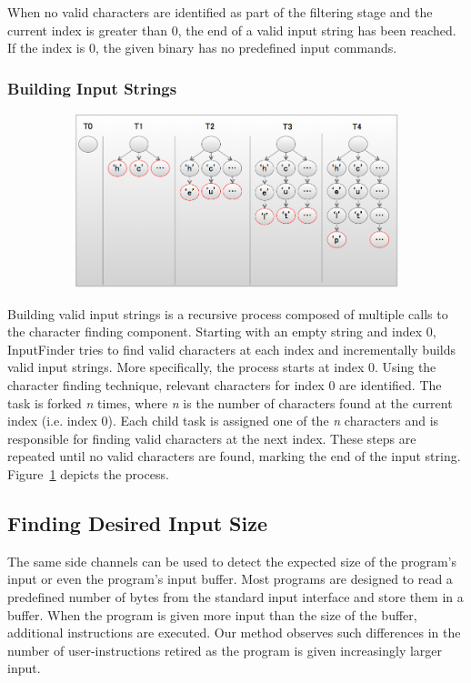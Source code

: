 \documentclass[10pt,twocolumn]{article}
\def \tool {InputFinder}
\begin{document}
When no valid characters are identified as part of the filtering stage and the current index is greater than 0, the end of a valid input string has been reached. If the index is 0, the given binary has no predefined input commands.

\subsubsection{Building Input Strings}

\begin{figure}[t]
\centering
\includegraphics[height=2in,width=6.5in]{string_builder.png}
\label{fig:string_builder}
\caption{}
\end{figure}


Building valid input strings is a recursive process composed of multiple calls to the character finding component.
Starting with an empty string and index 0, \tool{} tries to find valid characters at each index and incrementally builds valid input strings.
More specifically, the process starts at index 0.
Using the character finding technique, relevant characters for index 0 are identified.
The task is forked \textit{n} times, where \textit{n} is the number of characters found at the current index (i.e. index 0).
Each child task is assigned one of the \textit{n} characters and is responsible for finding valid characters at the next index.
These steps are repeated until no valid characters are found, marking the end of the input string.
Figure~\ref{fig:string_builder} depicts the process.

\subsection{Finding Desired Input Size}

The same side channels can be used to detect the expected size of the program's input or even the program's input buffer.
Most programs are designed to read a predefined number of bytes from the standard input interface and store them in a buffer.
When the program is given more input than the size of the buffer, additional instructions are executed.
Our method observes such differences in the number of user-instructions retired as the program is given increasingly larger input.
\end{document}
